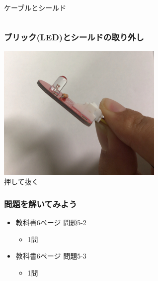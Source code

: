 \begin{frame}
\begin{columns}
\begin{column}{0.48\textwidth}
            {ケーブルとシールド}
        \end{column}
    \end{columns}
\end{frame}

\begin{frame}
    \frametitle{ブリック(LED)とシールドの取り外し}
    \begin{center}
        \includegraphics[width=0.6\textwidth]{images/chap05/text05-img011.jpg}
        {\\押して抜く}
    \end{center}
\end{frame}

\begin{frame}[fragile]
    \frametitle{問題を解いてみよう}
    \begin{itemize}
        \item 教科書6ページ 問題5-2
        \begin{itemize}
            \item 1問
        \end{itemize}
        \item 教科書6ページ 問題5-3
        \begin{itemize}
            \item 1問
        \end{itemize}
    \end{itemize}
\end{frame}
